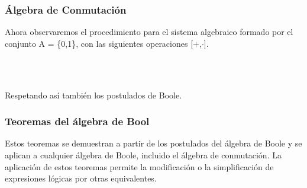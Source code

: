 \documentclass[aspectratio=169]{beamer}
\begin{document}
\begin{frame}
\frametitle{Álgebra de Conmutación}

Ahora observaremos el procedimiento para el sistema algebraico formado por el conjunto A = \{0,1\}, con las siguientes operaciones [\textcolor{ITMOtomato}{\(+\)},\textcolor{ITMOtomato}{\(\cdot\)}].\\
\hspace{2px}\\
\begin{columns}[c]




\end{columns}
\hspace{2px}\\
Respetando así también los postulados de Boole.
\end{frame}

\begin{frame}
\frametitle{Teoremas del álgebra de Bool}

Estos teoremas se demuestran a partir de los postulados del álgebra de Boole y se aplican a cualquier álgebra de Boole, incluido el álgebra de conmutación.
La aplicación de estos teoremas permite la modificación o la simplificación de expresiones lógicas por otras equivalentes.


\end{frame}
\end{document}
